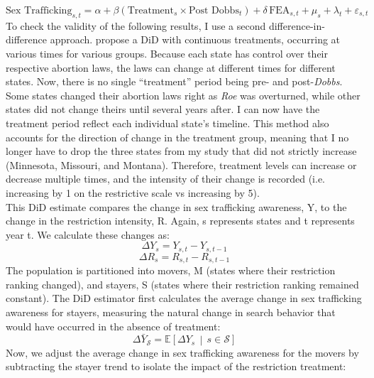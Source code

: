 \begin{equation}
\text{Sex Trafficking}_{s,t}
=
\alpha
+ \beta \left( \text{Treatment}_{s}
\times \text{Post Dobbs}_{t} \right)
+ \delta\,\text{FEA}_{s,t}
+ \mu_{s}
+ \lambda_{t}
+ \varepsilon_{s,t}
\end{equation}
To check the validity of the following results, I use a second difference-in-difference approach. \cite{diff2} propose a DiD with continuous treatments, occurring at various times for various groups. Because each state has control over their respective abortion laws, the laws can change at different times for different states. Now, there is no single ``treatment'' period being pre- and post-\textit{Dobbs}. Some states changed their abortion laws right as \textit{Roe} was overturned, while other states did not change theirs until several years after. I can now have the treatment period reflect each individual state's timeline. This method also accounts for the direction of change in the treatment group, meaning that I no longer have to drop the three states from my study that did not strictly increase (Minnesota, Missouri, and Montana). Therefore, treatment levels can increase or decrease multiple times, and the intensity of their change is recorded (i.e. increasing by 1 on the restrictive scale vs increasing by 5). \\
\indent This DiD estimate compares the change in sex trafficking awareness, Y, to the change in the restriction intensity, R. Again, s represents states and t represents year t. We calculate these changes as: 
\begin{equation}
\Delta Y_s = Y_{s,t} - Y_{s,t-1}
\end{equation}
\begin{equation}
\Delta R_s = R_{s,t} - R_{s,t-1}
\end{equation}
The population is partitioned into movers, M (states where their restriction ranking changed), and stayers, S (states where their restriction ranking remained constant). The DiD estimator first calculates the average change in sex trafficking awareness for stayers, measuring the natural change in search behavior that would have occurred in the absence of treatment: 
\begin{equation}
\Delta \bar{Y}_{\mathcal{S}} = \mathbb{E}\left[ \Delta Y_s \,\middle|\, s \in \mathcal{S} \right]
\end{equation}
Now, we adjust the average change in sex trafficking awareness for the movers by subtracting the stayer trend to isolate the impact of the restriction treatment:
